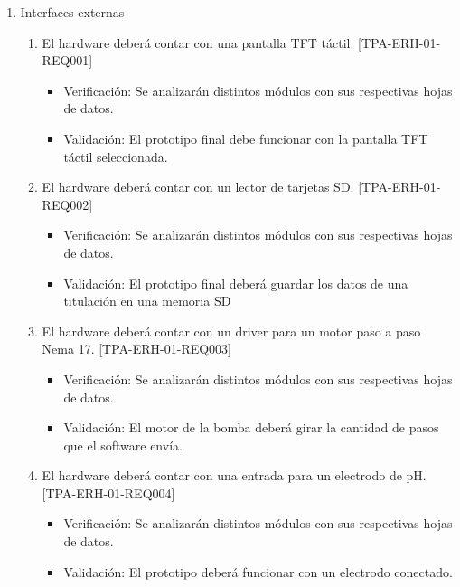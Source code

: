 \documentclass[11pt]{charter}
\begin{document}
\begin{enumerate}
\item Interfaces externas
	\begin{enumerate}
	\item El hardware deberá contar con una pantalla TFT táctil. [TPA-ERH-01-REQ001]
	\begin{itemize}
\item Verificación: Se analizarán distintos módulos con sus respectivas hojas de datos.\\
\item Validación: El prototipo final debe funcionar con la pantalla TFT táctil seleccionada.\\
\end{itemize}
	\item El hardware deberá contar con un lector de tarjetas SD. [TPA-ERH-01-REQ002]
	\begin{itemize}
\item Verificación: Se analizarán distintos módulos con sus respectivas hojas de datos.\\
\item Validación: El prototipo final deberá guardar los datos de una titulación en una memoria SD\\
\end{itemize}
	\item El hardware deberá contar con un driver para un motor paso a paso Nema 17. [TPA-ERH-01-REQ003]
	\begin{itemize}
\item Verificación: Se analizarán distintos módulos con sus respectivas hojas de datos.\\
\item Validación: El motor de la bomba deberá girar la cantidad de pasos que el software envía.\\
\end{itemize}
	\item El hardware deberá contar con una entrada para un electrodo de pH. [TPA-ERH-01-REQ004]
	\begin{itemize}
\item Verificación: Se analizarán distintos módulos con sus respectivas hojas de datos.\\
\item Validación: El prototipo deberá funcionar con un electrodo conectado.\\
\end{itemize}
\end{enumerate}
	

\end{enumerate}
\end{document}
